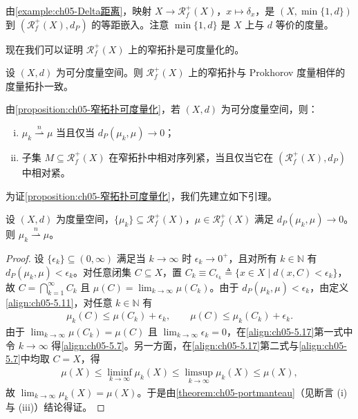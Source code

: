 \documentclass[../../main.tex]{subfiles}%
\begin{document}
\begin{remark}\label{remark:ch05-Delta等距}
由\cref{example:ch05-Delta距离}，映射 $X\to\mathscr{R}^+_f(X)$，$x\mapsto\delta_x$，是 $(X,\min\{1,d\})$ 到 $(\mathscr{R}^+_f(X),d_P)$ 的等距嵌入。注意 $\min\{1,d\}$ 是 $X$ 上与 $d$ 等价的度量。
\end{remark}

现在我们可以证明 $\mathscr{R}^+_f(X)$ 上的窄拓扑是可度量化的。

\begin{proposition}\label{proposition:ch05-窄拓扑可度量化}
设 $(X,d)$ 为可分度量空间。则 $\mathscr{R}^+_f(X)$ 上的窄拓扑与 Prokhorov 度量相伴的度量拓扑一致。
\end{proposition}

\begin{remark}\label{remark:ch05-Prokhorov推论}
由\cref{proposition:ch05-窄拓扑可度量化}，若 $(X,d)$ 为可分度量空间，则：
\begin{enumerate}[(i)]
\item\label{item:ch05-prok-i} $\mu_k\stackrel{n}{\rightharpoonup}\mu$ 当且仅当 $d_P(\mu_k,\mu)\to0$；
\item\label{item:ch05-prok-ii} 子集 $M\subseteq\mathscr{R}^+_f(X)$ 在窄拓扑中相对序列紧，当且仅当它在 $(\mathscr{R}^+_f(X),d_P)$ 中相对紧。
\end{enumerate}
\end{remark}

为证\cref{proposition:ch05-窄拓扑可度量化}，我们先建立如下引理。

\begin{lemma}\label{lemma:ch05-Prokhorov到窄}
设 $(X,d)$ 为度量空间，$\{\mu_k\}\subseteq\mathscr{R}^+_f(X)$，$\mu\in\mathscr{R}^+_f(X)$ 满足 $d_P(\mu_k,\mu)\to0$。则 $\mu_k\stackrel{n}{\rightharpoonup}\mu$。
\end{lemma}

\begin{proof}
设 $\{\epsilon_k\}\subseteq(0,\infty)$ 满足当 $k\to\infty$ 时 $\epsilon_k\to0^+$，且对所有 $k\in\mathbb{N}$ 有 $d_P(\mu_k,\mu)<\epsilon_k$。对任意闭集 $C\subseteq X$，置 $C_k\equiv C_{\epsilon_k}\triangleq \{x\in X\mid d(x,C)<\epsilon_k\}$，故 $C=\bigcap_{k=1}^\infty C_k$ 且 $\mu(C)=\lim_{k\to\infty}\mu(C_k)$。由于 $d_P(\mu_k,\mu)<\epsilon_k$，由定义\eqref{align:ch05-5.11}，对任意 $k\in\mathbb{N}$ 有
\begin{align}
\mu_k(C)\leqslant\mu(C_k)+\epsilon_k,\qquad
\mu(C)\leqslant\mu_k(C_k)+\epsilon_k.\label{align:ch05-5.17}
\end{align}
由于 $\lim_{k\to\infty}\mu(C_k)=\mu(C)$ 且 $\lim_{k\to\infty}\epsilon_k=0$，在\eqref{align:ch05-5.17}第一式中令 $k\to\infty$ 得\eqref{align:ch05-5.7}。另一方面，在\eqref{align:ch05-5.17}第二式与\eqref{align:ch05-5.7}中均取 $C=X$，得
\begin{align*}
\mu(X)\leqslant\liminf_{k\to\infty}\mu_k(X)\leqslant\limsup_{k\to\infty}\mu_k(X)\leqslant\mu(X),
\end{align*}
故 $\lim_{k\to\infty}\mu_k(X)=\mu(X)$。于是由\cref{theorem:ch05-portmanteau}（见断言 (i) 与 (iii)）结论得证。
\end{proof}
\end{document}
